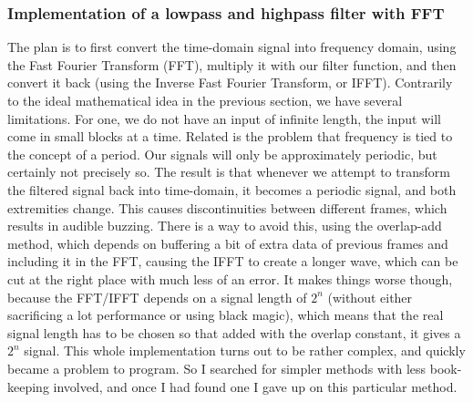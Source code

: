 \documentclass[11pt,a4paper]{article}
\begin{document}
\begin{figure}
\end{figure}

\subsubsection{Implementation of a lowpass and highpass filter with FFT}

The plan is to first convert the time-domain signal into frequency domain, using the Fast Fourier Transform (FFT), multiply it with our filter function, and then convert it back (using the Inverse Fast Fourier Transform, or IFFT). Contrarily to the ideal mathematical idea in the previous section, we have several limitations. For one, we do not have an input of infinite length, the input will come in small blocks at a time. Related is the problem that frequency is tied to the concept of a period. Our signals will only be approximately periodic, but certainly not precisely so.
The result is that whenever we attempt to transform the filtered signal back into time-domain, it becomes a periodic signal, and both extremities change. This causes discontinuities between different frames, which results in audible buzzing. There is a way to avoid this, using the overlap-add method, which depends on buffering a bit of extra data of previous frames and including it in the FFT, causing the IFFT to create a longer wave, which can be cut at the right place with much less of an error.
It makes things worse though, because the FFT/IFFT depends on a signal length of $2^n$ (without either sacrificing a lot performance or using black magic), which means that the real signal length has to be chosen so that added with the overlap constant, it gives a $2^n$ signal. This whole implementation turns out to be rather complex, and quickly became a problem to program. So I searched for simpler methods with less book-keeping involved, and once I had found one I gave up on this particular method.
\end{document}
